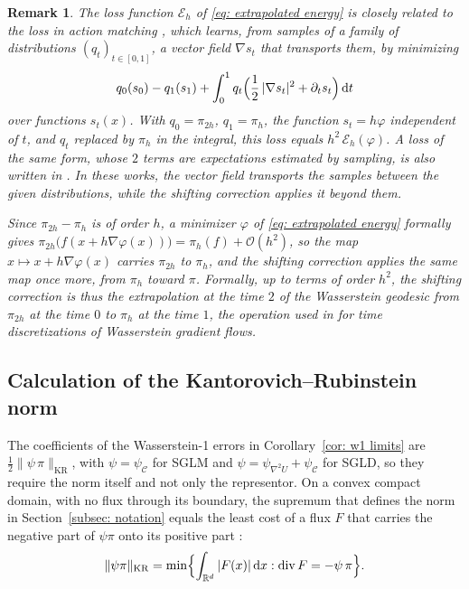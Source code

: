 \documentclass{article}
\newtheorem{remark}{Remark}
\newcommand{\D}{\mathrm{d}}
\newcommand{\norm}[1]{\lVert #1 \rVert}
\numberwithin{equation}{section}
\begin{document}
\begin{remark}
The loss function $\mathcal E_h$ of \eqref{eq: extrapolated energy} is closely related to the loss in action matching \citep{neklyudov2023action}, which learns, from samples of a family of distributions $(q_t)_{t \in [0,1]}$, a vector field $\nabla s_t$ that transports them, by minimizing
\begin{equation*}
    q_0(s_0) - q_1(s_1) + \int_0^1 q_t\Bigl( \frac12\, |\nabla s_t|^2 + \partial_t s_t \Bigr)\, \D t
\end{equation*}
over functions $s_t(x)$. With $q_0 = \pi_{2h}$, $q_1 = \pi_h$, the function $s_t = h \varphi$ independent of $t$, and $q_t$ replaced by $\pi_h$ in the integral, this loss equals $h^2\, \mathcal E_h(\varphi)$. A loss of the same form, whose $2$ terms are expectations estimated by sampling, is also written in \citep{cao2022learning}. In these works, the vector field transports the samples between the given distributions, while the shifting correction applies it beyond them.

Since $\pi_{2h} - \pi_h$ is of order $h$, a minimizer $\varphi$ of \eqref{eq: extrapolated energy} formally gives $\pi_{2h}\bigl( f(x + h \nabla \varphi(x)) \bigr) = \pi_h(f) + \mathcal O(h^2)$, so the map $x \mapsto x + h \nabla \varphi(x)$ carries $\pi_{2h}$ to $\pi_h$, and the shifting correction applies the same map once more, from $\pi_h$ toward $\pi$. Formally, up to terms of order $h^2$, the shifting correction is thus the extrapolation at the time $2$ of the Wasserstein geodesic from $\pi_{2h}$ at the time $0$ to $\pi_h$ at the time $1$, the operation used in \citep{gallouet2024geodesic, gallouet2025metric} for time discretizations of Wasserstein gradient flows.
\end{remark}

\subsection{Calculation of the Kantorovich--Rubinstein norm}
\label{subsec: kr computation}

The coefficients of the Wasserstein-1 errors in Corollary~\ref{cor: w1 limits} are $\frac12 \norm{\psi\,\pi}_{\mathrm{KR}}$, with $\psi = \psi_{\mathcal C}$ for SGLM and $\psi = \psi_{\nabla^2 U} + \psi_{\mathcal C}$ for SGLD, so they require the norm itself and not only the representor. On a convex compact domain, with no flux through its boundary, the supremum that defines the norm in Section~\ref{subsec: notation} equals the least cost of a flux $F$ that carries the negative part of $\psi\pi$ onto its positive part \citep[(2)]{li2018parallel}:
\begin{equation}
    \norm{\psi\pi}_{\mathrm{KR}} = \min\Bigl\{ \int_{\mathbb R^d} |F(x)|\, \D x : \operatorname{div} F = -\psi\,\pi \Bigr\} .
    \label{eq: kr flux}
\end{equation}
\end{document}
